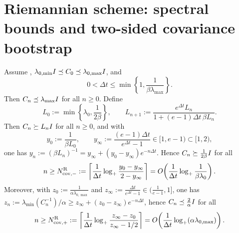 \section{Riemannian scheme: spectral bounds and two-sided covariance bootstrap}

\begin{lemma}
\label{lem:Riem-cov}
Assume , $\lambda_{0,\min}I\preceq C_0\preceq\lambda_{0,\max}I$,
and
\[
    0<\Delta t\leq\min\left\{1,\frac1{\beta\lambda_{\max}}\right\}.
\]
Then $C_n\preceq\lambda_{\max}I$ for all $n\geq0$. Define
\[
    L_0:=\min\left\{\lambda_0,\frac1{2\beta}\right\},
    \qquad
    L_{n+1}:=\frac{e^{\Delta t}L_n}{1+(e-1)\Delta t\,\beta L_n}.
\]
Then $C_n\succeq L_nI$ for all $n\geq0$, and with
\[
    y_0:=\frac1{\beta L_0},
    \qquad
    y_\infty:=\frac{(e-1)\Delta t}{e^{\Delta t}-1}\in[1,e-1)\subset[1,2),
\]
one has $y_n:=(\beta L_n)^{-1}=y_\infty+(y_0-y_\infty)e^{-n\Delta t}$. Hence
$C_n\succeq\tfrac1{2\beta}I$ for all
\[
    n\geq
    N_{\mathrm{cov},-}^{\mathrm{R}}
    :=
    \left\lceil
        \frac1{\Delta t}
        \log_+\frac{y_0-y_\infty}{2-y_\infty}
    \right\rceil
    =
    O\!\left(\frac1{\Delta t}\log_+\frac1{\beta\lambda_0}\right).
\]
Moreover, with $z_0:=\tfrac1{\alpha\lambda_{0,\max}}$ and
$z_\infty:=\tfrac{\Delta t}{e^{\Delta t}-1}\in(\tfrac1{e-1},1]$, one has
$z_n:=\lambda_{\min}(C_n^{-1})/\alpha\geq z_\infty+(z_0-z_\infty)e^{-n\Delta t}$, hence
$C_n\preceq\tfrac2\alpha I$ for all
\[
    n\geq
    N_{\mathrm{cov},+}^{\mathrm{R}}
    :=
    \left\lceil
        \frac1{\Delta t}
        \log_+\frac{z_\infty-z_0}{z_\infty-1/2}
    \right\rceil
    =
    O\!\left(\frac1{\Delta t}\log_+(\alpha\lambda_{0,\max})\right).
\]
\end{lemma}

